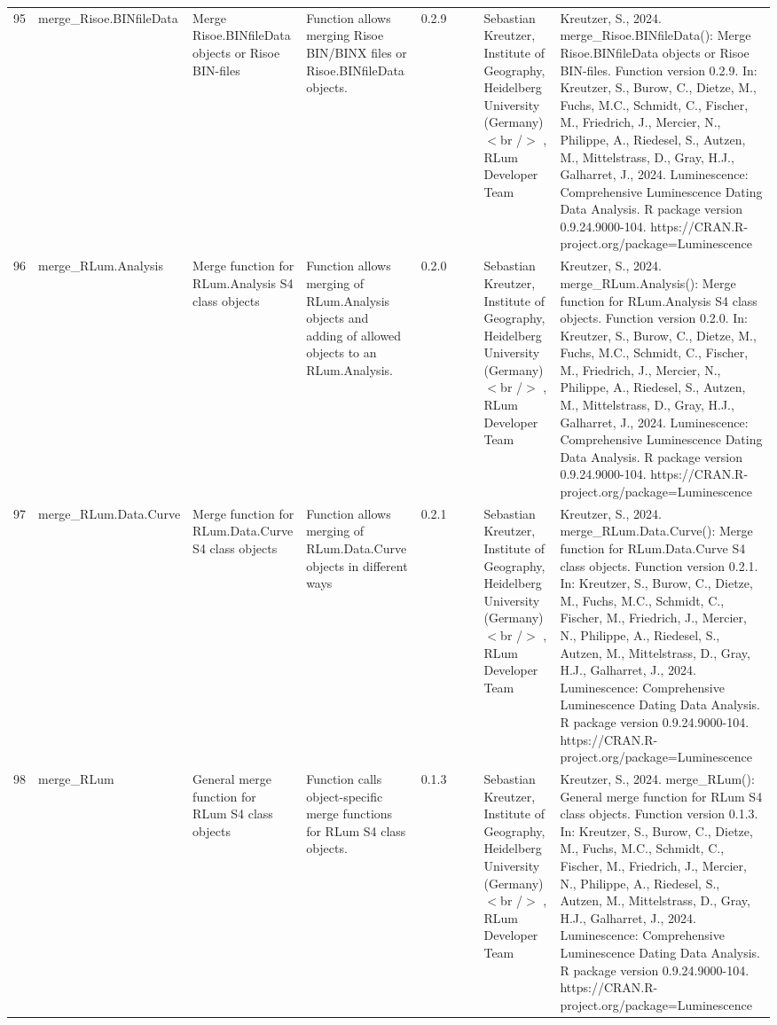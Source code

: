 \begin{table}[ht]
\begin{tabular}{rllllllll}
  95 & merge\_Risoe.BINfileData & Merge Risoe.BINfileData objects or Risoe BIN-files & Function allows merging Risoe BIN/BINX files or  Risoe.BINfileData  objects. & 0.2.9
 &  &  & Sebastian Kreutzer, Institute of Geography, Heidelberg University (Germany)$<$br /$>$ , RLum Developer Team & Kreutzer, S., 2024. merge\_Risoe.BINfileData(): Merge Risoe.BINfileData objects or Risoe BIN-files. Function version 0.2.9. In: Kreutzer, S., Burow, C., Dietze, M., Fuchs, M.C., Schmidt, C., Fischer, M., Friedrich, J., Mercier, N., Philippe, A., Riedesel, S., Autzen, M., Mittelstrass, D., Gray, H.J., Galharret, J., 2024. Luminescence: Comprehensive Luminescence Dating Data Analysis. R package version 0.9.24.9000-104. https://CRAN.R-project.org/package=Luminescence
 \\ 
  96 & merge\_RLum.Analysis & Merge function for RLum.Analysis S4 class objects & Function allows merging of RLum.Analysis objects and adding of allowed objects to an RLum.Analysis. & 0.2.0
 &  &  & Sebastian Kreutzer, Institute of Geography, Heidelberg University (Germany)$<$br /$>$ , RLum Developer Team & Kreutzer, S., 2024. merge\_RLum.Analysis(): Merge function for RLum.Analysis S4 class objects. Function version 0.2.0. In: Kreutzer, S., Burow, C., Dietze, M., Fuchs, M.C., Schmidt, C., Fischer, M., Friedrich, J., Mercier, N., Philippe, A., Riedesel, S., Autzen, M., Mittelstrass, D., Gray, H.J., Galharret, J., 2024. Luminescence: Comprehensive Luminescence Dating Data Analysis. R package version 0.9.24.9000-104. https://CRAN.R-project.org/package=Luminescence
 \\ 
  97 & merge\_RLum.Data.Curve & Merge function for RLum.Data.Curve S4 class objects & Function allows merging of RLum.Data.Curve objects in different ways & 0.2.1
 &  &  & Sebastian Kreutzer, Institute of Geography, Heidelberg University (Germany)$<$br /$>$ , RLum Developer Team & Kreutzer, S., 2024. merge\_RLum.Data.Curve(): Merge function for RLum.Data.Curve S4 class objects. Function version 0.2.1. In: Kreutzer, S., Burow, C., Dietze, M., Fuchs, M.C., Schmidt, C., Fischer, M., Friedrich, J., Mercier, N., Philippe, A., Riedesel, S., Autzen, M., Mittelstrass, D., Gray, H.J., Galharret, J., 2024. Luminescence: Comprehensive Luminescence Dating Data Analysis. R package version 0.9.24.9000-104. https://CRAN.R-project.org/package=Luminescence
 \\ 
  98 & merge\_RLum & General merge function for RLum S4 class objects & Function calls object-specific merge functions for RLum S4 class objects. & 0.1.3
 &  &  & Sebastian Kreutzer, Institute of Geography, Heidelberg University (Germany)$<$br /$>$ , RLum Developer Team & Kreutzer, S., 2024. merge\_RLum(): General merge function for RLum S4 class objects. Function version 0.1.3. In: Kreutzer, S., Burow, C., Dietze, M., Fuchs, M.C., Schmidt, C., Fischer, M., Friedrich, J., Mercier, N., Philippe, A., Riedesel, S., Autzen, M., Mittelstrass, D., Gray, H.J., Galharret, J., 2024. Luminescence: Comprehensive Luminescence Dating Data Analysis. R package version 0.9.24.9000-104. https://CRAN.R-project.org/package=Luminescence

\end{tabular}
\end{table}

